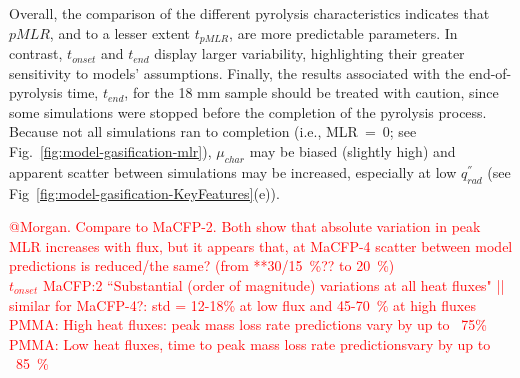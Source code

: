 \documentclass{article}
\begin{document}

Overall, the comparison of the different pyrolysis characteristics indicates that $pMLR$, and to a lesser extent $t_{pMLR}$, are more predictable parameters. In contrast, $t_{onset}$ and $t_{end}$ display larger variability, highlighting their greater sensitivity to models' assumptions. Finally, the results associated with the end-of-pyrolysis time, $t_{end}$, for the 18 mm sample should be treated with caution, since some simulations were stopped before the completion of the pyrolysis process.  Because not all simulations ran to completion (i.e., MLR~=~0; see Fig.~\ref{fig:model-gasification-mlr}), $\mu_{char}$ may be biased (slightly high) and apparent scatter between simulations may be increased, especially at low $q^{''}_{rad}$ (see Fig~\ref{fig:model-gasification-KeyFeatures}(e)).

\textcolor{red}{@Morgan. Compare to MaCFP-2. Both show that absolute variation in peak MLR increases with flux, but it appears that, at MaCFP-4 scatter between model predictions is reduced/the same? (from **30/15~\%?? to 20~\%)\\
	$t_{onset}$ MaCFP:2 ``Substantial (order of magnitude) variations at all heat fluxes" || similar for MaCFP-4?: std = 12-18\% at low flux and 45-70~\% at high fluxes\\
PMMA: High heat fluxes: peak mass loss rate predictions vary by up to ~75\%\\
PMMA: Low heat fluxes, time to peak mass loss rate predictionsvary by up to ~85~\%\\
}
\end{document}
